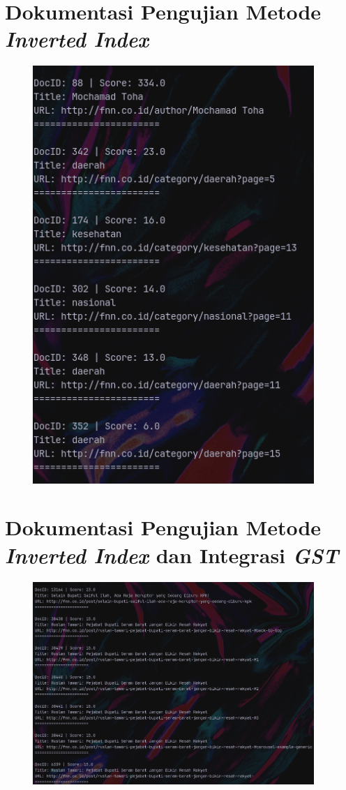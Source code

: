 \appendix 
\chapter{Dokumentasi Pengujian Metode \textit{Inverted Index}}
\begin{figure}[H]
	\centering
	\includegraphics[width=0.95\textwidth]{gambar/hasil_inv_bupati}	
\end{figure}

\chapter{Dokumentasi Pengujian Metode \textit{Inverted Index} dan Integrasi \textit{GST}}
\begin{figure}[H]
	\centering
	\includegraphics[width=0.95\textwidth]{gambar/hasil_gst_bupati}	
\end{figure}
